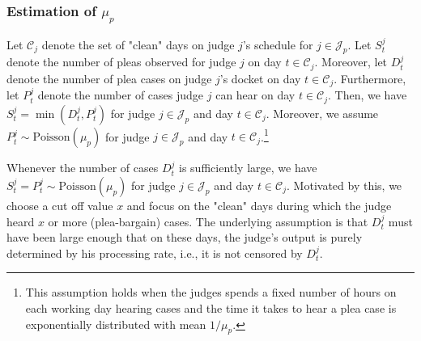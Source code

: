 \documentclass[11pt, oneside]{article}   	%
\theoremstyle{ModifiedStyle}
\begin{document}
\subsubsection{Estimation of $\mu_p$}
\label{Sec:Estimation:Capacity_Estimation:Plea_Capacity}
Let $\mathcal{C}_j$ denote the set of "clean" days on judge $j$'s schedule for $j\in\mathcal{J}_p$. Let $S^j_t$ denote the number of pleas observed for judge $j$ on day $t\in\mathcal{C}_j$. Moreover, let $D^j_t$ denote the number of plea cases on judge $j$'s docket on day $t\in\mathcal{C}_j$. Furthermore, let $P^j_t$ denote the number of cases judge $j$ can hear on day $t\in\mathcal{C}_j$. Then, we have $S^j_t = \min(D^j_t,P^j_t)$ for judge $j\in\mathcal{J}_p$ and day $t\in\mathcal{C}_j$. Moreover, we assume $P^j_t \sim \text{Poisson}(\mu_p)$ for judge $j\in\mathcal{J}_p$ and day $t\in\mathcal{C}_j$.\footnote{This assumption holds when the judges spends a fixed number of hours on each working day hearing cases and the time it takes to hear a plea case is exponentially distributed with mean $1/\mu_p$.}

Whenever the number of cases $D^j_t$ is sufficiently large, we have $S^j_t = P^j_t \sim \text{Poisson}(\mu_p)$ for judge $j\in\mathcal{J}_p$ and day $t\in\mathcal{C}_j$. Motivated by this, we choose a cut off value $x$ and focus on the "clean" days during which the judge heard $x$ or more (plea-bargain) cases. The underlying assumption is that $D^j_t$ must have been large enough that on these days, the judge's output is purely determined by his processing rate, i.e., it is not censored by $D^j_t$.
\end{document}
